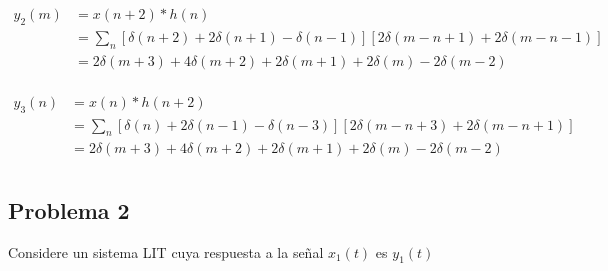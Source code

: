 \documentclass[a4paper,12pt,final]{article}
\begin{document}
      \begin{equation*}
        \begin{split}
          y_2\left(m\right) & = x\left(n+2\right)*h\left(n\right) \\
                            & = \sum_n \left[\delta\left(n+2\right) + 2\delta\left(n+1\right) - \delta\left(n-1\right)\right]
                                       \left[2\delta\left(m-n+1\right) + 2\delta\left(m-n-1\right)\right] \\
                            & = 2\delta\left(m+3\right) + 4\delta\left(m+2\right) + 2\delta\left(m+1\right) + 2\delta\left(m\right) - 2\delta\left(m-2\right) \\
        \end{split}
      \end{equation*}

      \begin{equation*}
        \begin{split}
          y_3\left(n\right) & = x\left(n\right)*h\left(n+2\right) \\
                            & = \sum_n \left[\delta\left(n\right) + 2\delta\left(n-1\right) - \delta\left(n-3\right)\right]
                                       \left[2\delta\left(m-n+3\right) + 2\delta\left(m-n+1\right)\right] \\
                            & = 2\delta\left(m+3\right) + 4\delta\left(m+2\right) + 2\delta\left(m+1\right) + 2\delta\left(m\right) - 2\delta\left(m-2\right) \\
        \end{split}
      \end{equation*}

  \newpage
  \subsection*{Problema 2}
    \noindent Considere un sistema LIT cuya respuesta a la señal $x_1\left(t\right)$ es $y_1\left(t\right)$
\end{document}
